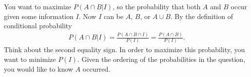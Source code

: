 

\setcounter{theorem}{14}

\begin{exercise}[BH.2.15]
\begin{solution}
	You want to maximize $P(A\cap B|I)$, so the probability that both $A$ and $B$ occur given some information $I$. Now $I$ can be $A$, $B$, or $A\cup B$. By the definition of conditional probability
	\begin{align*}
		P(A\cap B|I) =\frac{P(A\cap B\cap I)}{P(I)} = \frac{P(A\cap B)}{P(I)}.
	\end{align*}
	Think about the second equality sign. In order to maximize this probability, you want to minimize $P(I)$. Given the ordering of the probabilities in the question, you would like to know $A$ occurred.	
\end{solution}
\end{exercise}


